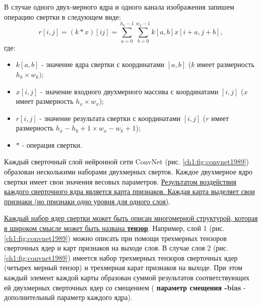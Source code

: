 \documentclass[12pt]{article}
\begin{document}
\begin{sloppypar}
В случае одного двух-мерного ядра и одного канала изображения запишем операцию свертки в следующем виде:
\begin{equation}
    r[i,j] = (k\ast x)[ij] = \sum_{a=0}^{h_k-1}\sum_{b=0}^{w_k-1}k[a,b]x[i+a,j+b], 
\end{equation}
где:
\begin{itemize}
\itemsep 0em 
    \item $k[a,b]$ - значение ядра свертки с координатами $[a,b]$ ($k$ имеет размерность $h_k \times w_k)$;
    \item $x[i,j]$ - значение входного двухмерного массива с координатами $[i,j]$ ($x$ имеет размерность $h_x \times w_x$);
    \item $r[i,j]$ - значение результата свертки с координатами  $[i,j]$ ($r$ имеет размерность $h_x-h_k+1 \times w_x - w_k +1$);
    \item $\ast$ - операция свертки.
\end{itemize}



Каждый сверточный слой нейронной сети ConvNet (рис. \ref{ch1:fig:convnet1989}) образован несколькими наборами двухмерных сверток. 
Каждое двухмерное ядро свертки имеет свои значения весовых параметров.
\uline{
Результатом воздействия каждого сверточного ядра является карта признаков. Каждая карта выделяет свои признаки (но признаки одно уровня для одного слоя)}.  

\uline{Каждый набор ядер свертки может быть описан многомерной структурой, которая в широком смысле может быть названа \textbf{тензор}}. Например, слой 1 (рис. \ref{ch1:fig:convnet1989}) можно описать при помощи трехмерных тензоров сверточных ядер и карт признаков на выходе слоя. В случае слоя 2 (рис. \ref{ch1:fig:convnet1989}) имеется набор  трехмерных тензоров сверточных ядер (четырех мерный тензор) и трехмерная карат признаков на выходе. При этом каждый элемент каждой карты образован суммой результатов соответствующих ей двухмерных сверточных ядер со смещением ( \textbf{параметр смещения -bias} - дополнительный параметр каждого ядра). 


\end{sloppypar}
\end{document}
